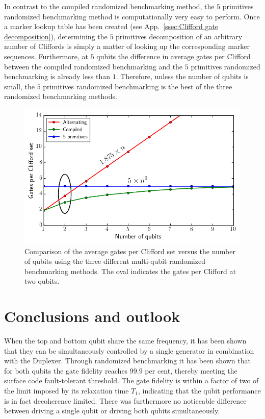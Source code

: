           In contrast to the compiled randomized benchmarking method, the $5$ primitives randomized benchmarking method is computationally very easy to perform. Once a marker lookup table has been created (see App.~\ref{ssec:Clifford gate decomposition}), determining the $5$ primitives decomposition of an arbitrary number of Cliffords is simply a matter of looking up the corresponding marker sequences. Furthermore, at $5$ qubits the difference in average gates per Clifford between the compiled randomized benchmarking and the $5$ primitives randomized benchmarking is already less than $1$. Therefore, unless the number of qubits is small, the $5$ primitives randomized benchmarking is the best of the three randomized benchmarking methods.

          \begin{figure}[h]
            \centering
            \includegraphics[width=.8\textwidth]{Figures/Randomized benchmarking/Clifford_comparison.png}
            \caption{Comparison of the average gates per Clifford set versus the number of qubits using the three different multi-qubit randomized benchmarking methods. The oval indicates the gates per Clifford at two qubits.}
            \label{fig:gate per Clifford versus qubits comparison}
          \end{figure}

  \chapter{Conclusions and outlook}

    When the top and bottom qubit share the same frequency, it has been shown that they can be simultaneously controlled by a single generator in combination with the Duplexer. Through randomized benchmarking it has been shown that for both qubits the gate fidelity reaches $99.9$ per cent, thereby meeting the surface code fault-tolerant threshold. The gate fidelity is within a factor of two of the limit imposed by its relaxation time $T_1$, indicating that the qubit performance is in fact decoherence limited. There was furthermore no noticeable difference between driving a single qubit or driving both qubits simultaneously.

